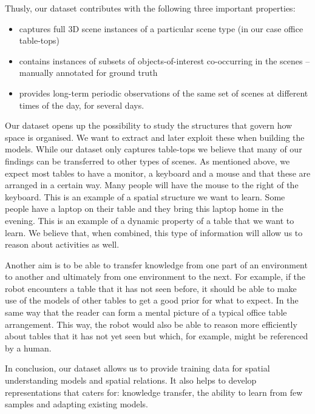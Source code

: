 \documentclass[letterpaper, 10 pt, conference]{ieeeconf}  %
\begin{document}
Thusly, our dataset contributes with the following three important properties:
\begin{itemize}
	\item captures full 3D scene instances of a particular scene type (in our case office table-tops)
	\item contains instances of subsets of objects-of-interest co-occurring in the scenes -- manually annotated for ground truth
	\item provides long-term periodic observations of the same set of scenes at different times of the day, for several days.
\end{itemize}

Our dataset opens up the possibility to study the structures that govern how space is organised. We want to extract and later exploit these 
when building the models. While our dataset only captures table-tops we believe that many of our findings can be transferred to other types 
of scenes. As mentioned above, we expect most tables to have a monitor, a keyboard and a mouse and that these are arranged in a certain way. 
Many people will have the mouse to the right of the keyboard. This is an example of a spatial structure we want to learn. Some people have a 
laptop on their table and they bring this laptop home in the evening. This is an example of a dynamic property of a table that we want to 
learn. We believe that, when combined, this type of information will allow us to reason about activities as well.

Another aim is to be able to transfer knowledge from one part of an
environment to another and ultimately from one environment to the
next. For example, if the robot encounters a table that it has not seen
before, it should be able to make use of the models of other tables to
get a good prior for what to expect. In the same way that the reader
can form a mental picture of a typical office table arrangement.
This way, the robot would also be able to reason more efficiently
about tables that it has not yet seen but which, for example, might be
referenced by a human.

In conclusion, our dataset allows us to provide training data 
for spatial understanding models and spatial relations. It also helps 
to develop representations that caters for: knowledge transfer, 
the ability to learn from few samples and adapting existing models.

\end{document}
